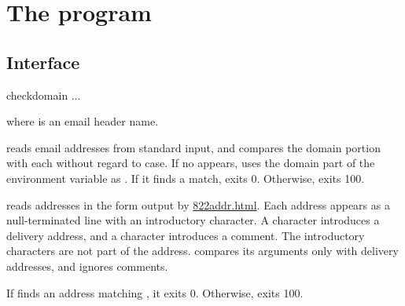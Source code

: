 
\chapter{The  program}

\section{Interface}
\begin{code}
  checkdomain  ...
\end{code}
where  is an email header name.

 reads email addresses from standard input,
and compares the domain portion with each 
without regard to case.
If no  appears,  uses the domain
part of the environment variable 
as .  If it finds a match,  exits 0.
Otherwise,  exits 100.

 reads addresses in the form output by 
\href{\cmd{822addr}}{822addr.html}.  Each address appears
as a null-terminated line with an introductory character.
A \cmd{+} character introduces a
delivery address, and a \cmd{(} character introduces a comment.
The introductory characters are not part of the address.
 compares its arguments only with delivery
addresses, and ignores comments.

If  finds an address matching , it exits 0.
Otherwise,  exits 100.

